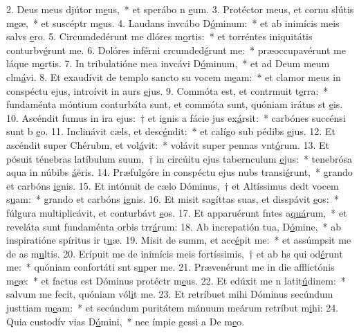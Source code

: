 2. Deus meus djútor m\uline{e}us,~* et sperábo n \uline{e}um.
3. Protéctor meus, et cornu slútis m\uline{e}æ,~* et suscéptr m\uline{e}us.
4. Laudans invcábo D\uline{ó}minum:~* et ab inimícis meis salvs \uline{e}ro.
5. Circumdedérunt me dlóres m\uline{o}rtis:~* et torréntes iniquitátis conturbv\uline{é}runt me.
6. Dolóres inférni crcumded\uline{é}runt me:~* præoccupavérunt me láque m\uline{o}rtis.
7. In tribulatióne mea invcávi D\uline{ó}minum,~* et ad Deum meum clm\uline{á}vi.
8. Et exaudívit de templo sancto su vocem m\uline{e}am:~* et clamor meus in conspéctu ejus, introívit in aurs \uline{e}jus.
9. Commóta est, et contrmuit t\uline{e}rra:~* fundaménta móntium conturbáta sunt, et commóta sunt, quóniam irátus st \uline{e}is.
10. Ascéndit fumus in ira ejus:~† et ignis a fácie jus ex\uline{á}rsit:~* carbónes succénsi sunt b \uline{e}o.
11. Inclinávit cæls, et desc\uline{é}ndit:~* et calígo sub pédibs \uline{e}jus.
12. Et ascéndit super Chérubm, et vol\uline{á}vit:~* volávit super pennas vnt\uline{ó}rum.
13. Et pósuit ténebras latíbulum suum,~† in circúitu ejus tabernculum \uline{e}jus:~* tenebrósa aqua in núbibs \uline{á}ëris.
14. Præfulgóre in conspéctu ejus nubs transi\uline{é}runt,~* grando et carbóns \uline{i}gnis.
15. Et intónuit de cælo Dóminus,~† et Altíssimus dedt vocem s\uline{u}am:~* grando et carbóns \uline{i}gnis.
16. Et misit sagíttas suas, et disspávit \uline{e}os:~* fúlgura multiplicávit, et conturbávt \uline{e}os.
17. Et apparuérunt fntes a\uline{quá}rum,~* et reveláta sunt fundaménta orbis trr\uline{á}rum:
18. Ab increpatión tua, D\uline{ó}mine,~* ab inspiratióne spíritus ir t\uline{u}æ.
19. Misit de summ, et acc\uline{é}pit me:~* et assúmpsit me de as m\uline{u}ltis.
20. Erípuit me de inimícis meis fortíssimis,~† et ab hs qui od\uline{é}runt me:~* quóniam confortáti snt s\uline{u}per me.
21. Prævenérunt me in die afflictónis m\uline{e}æ:~* et factus est Dóminus protéctr m\uline{e}us.
22. Et edúxit me n latit\uline{ú}dinem:~* salvum me fecit, quóniam vól\uline{i}t me.
23. Et retríbuet mihi Dóminus secúndum justtiam m\uline{e}am:~* et secúndum puritátem mánuum meárum retríbut m\uline{i}hi:
24. Quia custodív vias D\uline{ó}mini,~* nec ímpie gessi a De m\uline{e}o.
